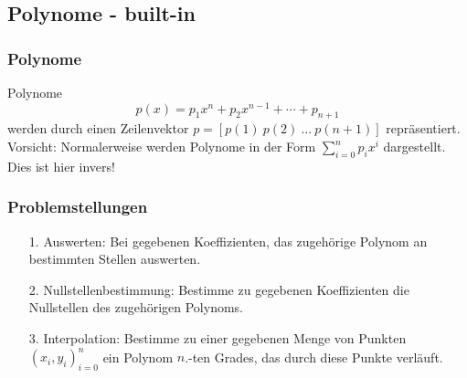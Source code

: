 \documentclass[hyperref={xetex}]{beamer}
\begin{document}
\subsection{Polynome - built-in}
%
%
\begin{frame}[fragile]\frametitle{Polynome}
Polynome 
\[ p(x)=p_1 x^n+ p_2 x^{n-1}+ \cdots + p_{n+1} \]
werden  durch einen Zeilenvektor $p=[p(1) \ p(2) \ \dots
\   p(n+1)]$ repr\"asentiert. \vspace*{0.5cm}\\

\alert{ Vorsicht:} Normalerweise werden Polynome in der Form
$\sum_{i=0}^n p_ix^i$ dargestellt. Dies ist hier invers!
\end{frame}
%
%
\begin{frame}[fragile]\frametitle{Problemstellungen}
\begin{itemize}
\item [1.] \alert{ Auswerten:} Bei gegebenen Koeffizienten, das
  zugeh\"orige Polynom an bestimmten Stellen auswerten.
\item [2.] \alert{ Nullstellenbestimmung:} Bestimme zu gegebenen
  Koeffizienten die Nullstellen des zugeh\"origen Polynoms.
\item [3.]  \alert{ Interpolation}: Bestimme zu einer gegebenen Menge von
  Punkten $(x_i,y_i)_{i=0}^n$ ein Polynom $n$.-ten Grades, das durch
  diese Punkte verl\"auft.
\end{itemize}
\end{frame}
%
%
\end{document}
